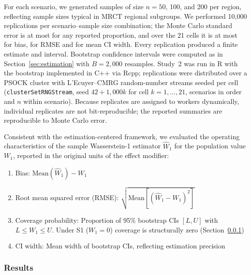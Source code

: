 \documentclass[AMA,Times1COL]{WileyNJDv5}
\begin{document}
For each scenario, we generated samples of size $n = 50$, 100, and 200 per region, reflecting sample sizes typical in MRCT regional subgroups. We performed 10{,}000 replications per scenario--sample size combination; the Monte Carlo standard error is at most  for any reported proportion, and over the 21 cells it is at most  for bias,  for RMSE and  for mean CI width. Every replication produced a finite estimate and interval. Bootstrap confidence intervals were computed as in Section~\ref{sec:estimation} with $B = 2{,}000$ resamples. Study~2 was run in R with the bootstrap implemented in C++ via Rcpp; replications were distributed over a PSOCK cluster with L'Ecuyer--CMRG random-number streams seeded per cell (\texttt{clusterSetRNGStream}, seed $42 + 1{,}000k$ for cell $k = 1, \ldots, 21$, scenarios in order and $n$ within scenario). Because replicates are assigned to workers dynamically, individual replicates are not bit-reproducible; the reported summaries are reproducible to Monte Carlo error.

Consistent with the estimation-centered framework, we evaluated the operating characteristics of the sample Wasserstein-1 estimator $\widehat{W}_1$ for the population value $W_1$, reported in the original units of the effect modifier:
\begin{enumerate}[1.]
\item Bias: $\text{Mean}(\widehat{W}_1) - W_1$
\item Root mean squared error (RMSE): $\sqrt{\text{Mean}[(\widehat{W}_1 - W_1)^2]}$
\item Coverage probability: Proportion of 95\% bootstrap CIs $[L, U]$ with $L \le W_1 \le U$. Under S1 ($W_1 = 0$) coverage is structurally zero (Section~\ref{sec:sim_results})
\item CI width: Mean width of bootstrap CIs, reflecting estimation precision
\end{enumerate}

\subsubsection{Results}\label{sec:sim_results}
\end{document}
